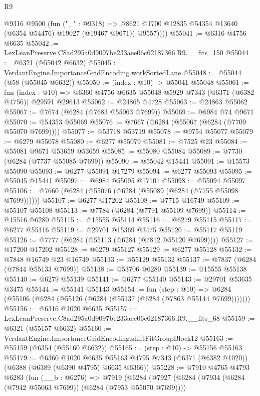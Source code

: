\begin{lexlean}{R9}
\begin{coremodule}
            @9316
            @9500
            (fun ("_" : @9318) =>
            @8621 @1700 @12835 @54354 @13640 (@6354 @54476) @19027 (@19467 @9671))
            @9557))))
@55041 := @6316 @4756 @6635
@55042 := LexLeanPreserve.C8ad295a0d9097be233aee06c62187366.R9.__fits_150
@55044 := @6321 (@55042 @6632)
@55045 := VerdantEngine.ImportanceGridEncoding.workSortedLane
@55048 := @55044 (@58 (@55045 @6632))
@55050 := (index : @10) -> @55041 @55048
@55061 := fun (index : @10) =>
  @6360 @4756 @6635 @55048 @5929 @7343 (@6371 (@6382 @4756)) @29591 @29613
@55062 := @24865 @4728
@55063 := @24863 @55062
@55067 := @7674 (@6284 (@7683 @55063 @7699))
@55069 := @6984 @74 @9671
@55070 := @54353 @55069
@55076 := @7667 (@6284 (@55067 (@6284 (@7709 @55070 @7699))))
@55077 := @53718 @53719
@55078 := @9754 @55077
@55079 := @6279 @55078
@55080 := @6277 @55079
@55081 := @7525 @23
@55084 := @55081 @9671 @53659 @53659
@55085 := @55080 @55084
@55089 := @7730 (@6284 (@7737 @55085 @7699))
@55090 := @55042 @15441
@55091 := @15573 @55090
@55093 := @6277 @55091 @17279
@55094 := @6277 @55093
@55095 := @55045 @15441
@55097 := @6984 @55095 @17101
@55098 := @55094 @55097
@55106 := @7660 (@6284 (@55076 (@6284 (@55089 (@6284 (@7755 @55098 @7699))))))
@55107 := @6277 @17202
@55108 := @7715 @16749
@55109 := @55107 @55108
@55113 := @7784 (@6284 (@7791 @55109 @7699))
@55114 := @15516 @6280
@55115 := @15555 @55114
@55116 := @6279 @55115
@55117 := @6277 @55116
@55119 := @29701 @15369 @3475
@55120 := @55117 @55119
@55126 := @7777 (@6284 (@55113 (@6284 (@7812 @55120 @7699))))
@55127 := @17200 @17202
@55128 := @6279 @55127
@55129 := @6277 @55128
@55132 := @7848 @16749 @23 @16749
@55133 := @55129 @55132
@55137 := @7837 (@6284 (@7844 @55133 @7699))
@55138 := @53706 @6280
@55139 := @15555 @55138
@55140 := @6279 @55139
@55141 := @6277 @55140
@55143 := @29701 @53635 @3475
@55144 := @55141 @55143
@55154 := fun (step : @10) =>
  @6284 (@55106 (@6284 (@55126 (@6284 (@55137 (@6284 (@7863 @55144 @7699)))))))
@55156 := @6316 @1020 @6635
@55157 := LexLeanPreserve.C8ad295a0d9097be233aee06c62187366.R9.__fits_68
@55159 := @6321 (@55157 @6632)
@55160 := VerdantEngine.ImportanceGridEncoding.shiftFitGroupBlock12
@55163 := @55159 (@6354 (@55160 @6632))
@55165 := (step : @10) -> @55156 @55163
@55179 := @6360
    @1020
    @6635
    @55163
    @4795
    @7343
    (@6371 (@6382 @1020))
    (@6388 (@6389 (@6390 @4795) @6635 @6366))
@55228 := @7910
    @4765
    @4793
    @6283
    (fun (__b : @6276) =>
    @7919
      (@6284
        (@7927
          (@6284 (@7934 (@6284 (@7942 @55063 @7699)) (@6284 (@7953 @55070 @7699))))

\end{coremodule}
\end{lexlean}
